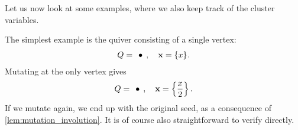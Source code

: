 \documentclass{article}
\newcommand{\bx}{\mathbf{x}}
\begin{document}
Let us now look at some examples, where we also keep track of the cluster variables.
\begin{example}
	The simplest example is the quiver consisting of a single vertex:
	\begin{equation*}
		Q = \begin{tikzcd}
			\bullet
		\end{tikzcd},
		\quad \bx = \{x\}.
	\end{equation*}
	Mutating at the only vertex gives
	\begin{equation*}
		Q = \begin{tikzcd}
			\bullet
		\end{tikzcd},
		\quad \bx = \left\{\frac{x}{2}\right\}.
	\end{equation*}
	If we mutate again, we end up with the original seed, as a consequence of
	\cref{lem:mutation_involution}. It is of course also straightforward to verify
	directly.
\end{example}
\end{document}
